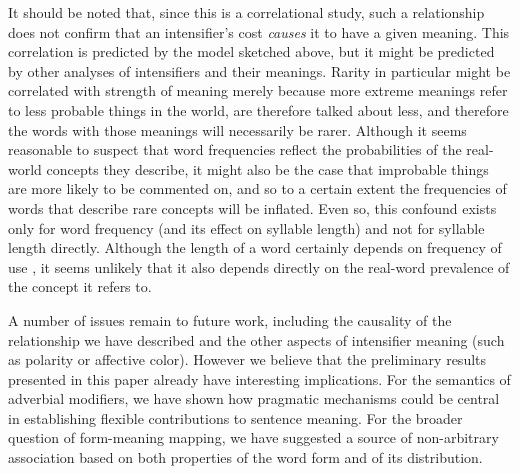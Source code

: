 \documentclass[10pt,letterpaper]{article}
\begin{document}
It should be noted that, since this is a correlational study, such a relationship does not confirm that an intensifier's cost \emph{causes} it to have a given meaning. This correlation is predicted by the model sketched above, but it might be predicted by other analyses of intensifiers and their meanings. Rarity in particular might be correlated with strength of meaning merely because more extreme meanings refer to less probable things in the world, are therefore talked about less, and therefore the words with those meanings will necessarily be rarer.
Although it seems reasonable to suspect that word frequencies reflect the probabilities of the real-world concepts they describe, it might also be the case that improbable things are more likely to be commented on, and so to a certain extent the frequencies of words that describe rare concepts will be inflated. Even so, this confound exists only for word frequency (and its effect on syllable length) and not for syllable length directly.
Although the length of a word certainly depends on frequency of use%
, it seems unlikely that it also depends directly on the real-word prevalence of the concept it refers to.

A number of issues remain to future work, including the causality of the relationship we have described and the other aspects of intensifier meaning (such as polarity or affective color).
However we believe that the preliminary results presented in this paper already have interesting implications. 
For the semantics of adverbial modifiers, we have shown how pragmatic mechanisms could be central in establishing flexible contributions to sentence meaning.
For the broader question of form-meaning mapping, we have suggested a source of non-arbitrary association based on both properties of the word form and of its distribution.
\end{document}
